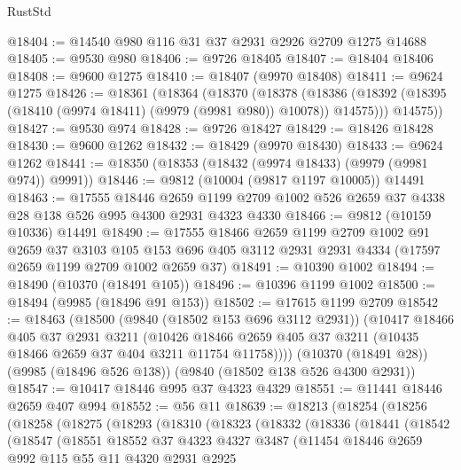 \begin{lexlean}{RustStd}
\begin{coremodule}
@18404 := @14540 @980 @116 @31 @37 @2931 @2926 @2709 @1275 @14688
@18405 := @9530 @980
@18406 := @9726 @18405
@18407 := @18404 @18406
@18408 := @9600 @1275
@18410 := @18407 (@9970 @18408)
@18411 := @9624 @1275
@18426 := @18361
    (@18364
      (@18370
        (@18378
          (@18386 (@18392 (@18395 (@18410 (@9974 @18411) (@9979 (@9981 @980)) @10078)) @14575)))
        @14575))
@18427 := @9530 @974
@18428 := @9726 @18427
@18429 := @18426 @18428
@18430 := @9600 @1262
@18432 := @18429 (@9970 @18430)
@18433 := @9624 @1262
@18441 := @18350 (@18353 (@18432 (@9974 @18433) (@9979 (@9981 @974)) @9991))
@18446 := @9812 (@10004 (@9817 @1197 @10005)) @14491
@18463 := @17555
    @18446
    @2659
    @1199
    @2709
    @1002
    @526
    @2659
    @37
    @4338
    @28
    @138
    @526
    @995
    @4300
    @2931
    @4323
    @4330
@18466 := @9812 (@10159 @10336) @14491
@18490 := @17555
    @18466
    @2659
    @1199
    @2709
    @1002
    @91
    @2659
    @37
    @3103
    @105
    @153
    @696
    @405
    @3112
    @2931
    @2931
    @4334
    (@17597 @2659 @1199 @2709 @1002 @2659 @37)
@18491 := @10390 @1002
@18494 := @18490 (@10370 (@18491 @105))
@18496 := @10396 @1199 @1002
@18500 := @18494 (@9985 (@18496 @91 @153))
@18502 := @17615 @1199 @2709
@18542 := @18463
    (@18500
      (@9840 (@18502 @153 @696 @3112 @2931))
      (@10417
        @18466
        @405
        @37
        @2931
        @3211
        (@10426 @18466 @2659 @405 @37 @3211 (@10435 @18466 @2659 @37 @404 @3211 @11754 @11758))))
    (@10370 (@18491 @28))
    (@9985 (@18496 @526 @138))
    (@9840 (@18502 @138 @526 @4300 @2931))
@18547 := @10417 @18446 @995 @37 @4323 @4329
@18551 := @11441 @18446 @2659 @407 @994
@18552 := @56 @11
@18639 := @18213
    (@18254
      (@18256
        (@18258
          (@18275
            (@18293
              (@18310
                (@18323
                  (@18332
                    (@18336
                      (@18441
                        (@18542
                          (@18547
                            (@18551
                              @18552
                              @37
                              @4323
                              @4327
                              @3487
                              (@11454
                                @18446
                                @2659
                                @992
                                @115
                                @55
                                @11
                                @4320
                                @2931
                                @2925

\end{coremodule}
\end{lexlean}
